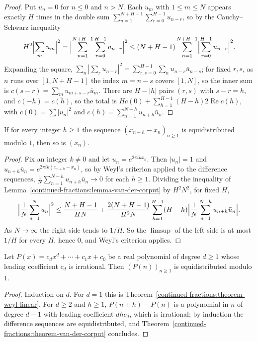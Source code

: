 \begin{proof}
Put $u_n = 0$ for $n \leq 0$ and $n > N$. Each $u_m$ with $1 \leq m \leq N$ appears exactly $H$ times in the double sum $\sum_{n=1}^{N+H-1}\sum_{r=0}^{H-1}u_{n-r}$, so by the Cauchy--Schwarz
inequality
\[
H^2\Bigl|\sum_mu_m\Bigr|^2 = \Bigl|\sum_{n=1}^{N+H-1}\sum_{r=0}^{H-1}u_{n-r}\Bigr|^2 \leq (N + H - 1)\sum_{n=1}^{N+H-1}\Bigl|\sum_{r=0}^{H-1}u_{n-r}\Bigr|^2.
\]
Expanding the square, $\sum_n|\sum_ru_{n-r}|^2 = \sum_{r,s=0}^{H-1}\sum_nu_{n-r}\bar{u}_{n-s}$; for fixed $r, s$, as $n$ runs over $[1, N + H - 1]$ the index $m = n - s$ covers $[1, N]$, so the inner sum is
$c(s - r) = \sum_mu_{m+s-r}\bar{u}_m$. There are $H - |h|$ pairs $(r, s)$ with $s - r = h$, and $c(-h) = \overline{c(h)}$, so the total is
$Hc(0) + \sum_{h=1}^{H-1}(H - h)2\operatorname{Re}c(h)$, with $c(0) = \sum|u_n|^2$ and $c(h) = \sum_{n=1}^{N-h}u_{n+h}\bar{u}_n$.
\end{proof}

\begin{theorem}\label{continued-fractions:theorem-van-der-corput}
If for every integer $h \geq 1$ the sequence $(x_{n+h} - x_n)_{n \geq 1}$ is equidistributed modulo $1$, then so is $(x_n)$.
\end{theorem}

\begin{proof}
Fix an integer $k \neq 0$ and let $u_n = e^{2\pi ikx_n}$. Then $|u_n| = 1$ and $u_{n+h}\bar{u}_n = e^{2\pi ik(x_{n+h} - x_n)}$, so by Weyl's criterion applied to the difference sequences,
$\frac1N\sum_{n=1}^{N-h}u_{n+h}\bar{u}_n \to 0$ for each $h \geq 1$. Dividing the inequality of Lemma~\ref{continued-fractions:lemma-van-der-corput} by $H^2N^2$, for fixed $H$,
\[
\Bigl|\frac1N\sum_{n=1}^Nu_n\Bigr|^2 \leq \frac{N + H - 1}{HN} + \frac{2(N + H - 1)}{H^2N}\sum_{h=1}^{H-1}(H - h)\Bigl|\frac1N\sum_{n=1}^{N-h}u_{n+h}\bar{u}_n\Bigr|.
\]
As $N \to \infty$ the right side tends to $1/H$. So the $\limsup$ of the left side is at most $1/H$ for every $H$, hence $0$, and Weyl's criterion applies.
\end{proof}

\begin{theorem}[Weyl]\label{continued-fractions:theorem-weyl-polynomial}
Let $P(x) = c_dx^d + \cdots + c_1x + c_0$ be a real polynomial of degree $d \geq 1$ whose leading coefficient $c_d$ is irrational. Then $(P(n))_{n \geq 1}$ is equidistributed modulo $1$.
\end{theorem}

\begin{proof}
Induction on $d$. For $d = 1$ this is Theorem~\ref{continued-fractions:theorem-weyl-linear}. For $d \geq 2$ and $h \geq 1$, $P(n + h) - P(n)$ is a polynomial in $n$ of degree $d - 1$ with leading
coefficient $dhc_d$, which is irrational; by induction the difference sequences are equidistributed, and Theorem~\ref{continued-fractions:theorem-van-der-corput} concludes.
\end{proof}

